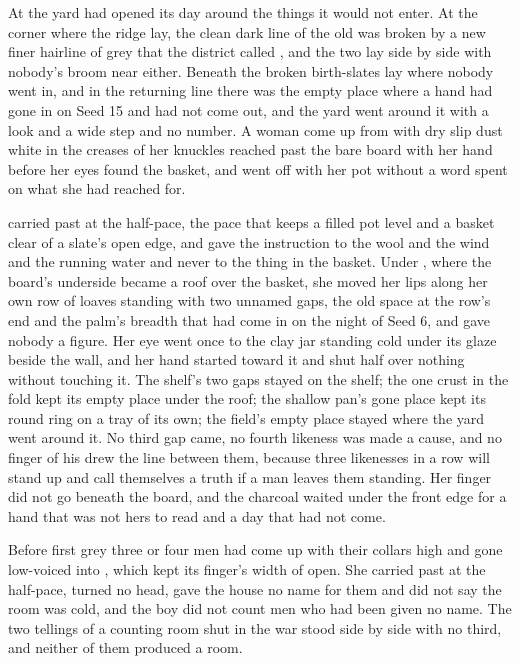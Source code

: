 At  the yard had opened its day around the things it would not enter. At the corner where the ridge lay, the clean dark line of the old  was broken by a new finer hairline of grey that the district called , and the two lay side by side with nobody's broom near either. Beneath  the broken birth-slates lay where nobody went in, and in the returning line there was the empty place where a hand had gone in on Seed 15 and had not come out, and the yard went around it with a look and a wide step and no number. A woman come up from  with dry slip dust white in the creases of her knuckles reached past the bare board with her hand before her eyes found the basket, and went off with her pot without a word spent on what she had reached for.

 carried past at the half-pace, the pace that keeps a filled pot level and a basket clear of a slate's open edge, and gave the instruction to the wool and the wind and the running water and never to the thing in the basket. Under , where the board's underside became a roof over the basket, she moved her lips along her own row of loaves standing with two unnamed gaps, the old space at the row's end and the palm's breadth that had come in on the night of Seed 6, and gave nobody a figure. Her eye went once to the clay jar standing cold under its glaze beside the wall, and her hand started toward it and shut half over nothing without touching it. The shelf's two gaps stayed on the shelf; the one crust in the fold kept its empty place under the roof; the shallow pan's gone place kept its round ring on a tray of its own; the field's empty place stayed where the yard went around it. No third gap came, no fourth likeness was made a cause, and no finger of his drew the line between them, because three likenesses in a row will stand up and call themselves a truth if a man leaves them standing. Her finger did not go beneath the board, and the charcoal waited under the front edge for a hand that was not hers to read and a day that had not come.

\scenebreak

Before first grey three or four men had come up  with their collars high and gone low-voiced into , which kept its finger's width of open. She carried past at the half-pace, turned no head, gave the house no name for them and did not say the room was cold, and the boy did not count men who had been given no name. The two tellings of a counting room shut in the war stood side by side with no third, and neither of them produced a room.

